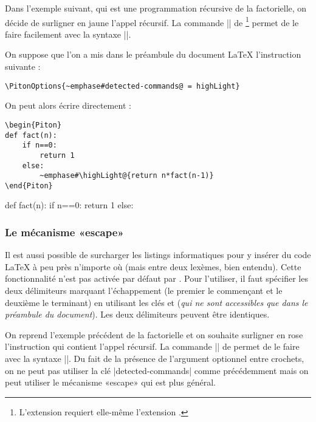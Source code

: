 \documentclass[dvipsnames,svgnames]{article}
\begin{document}
\medskip
Dans l'exemple suivant, qui est une programmation récursive de la factorielle, on décide
de surligner en jaune l'appel récursif. La commande |\highLight| de
\footnote{L'extension  requiert elle-même l'extension
  .} permet de le faire facilement avec la
syntaxe ||.

\smallskip
On suppose que l'on a mis dans le préambule du document LaTeX l'instruction suivante :
\begin{Verbatim}
\PitonOptions{~emphase#detected-commands@ = highLight}
\end{Verbatim}

On peut alors écrire directement :
\begin{Verbatim}
\begin{Piton}
def fact(n):
    if n==0:
        return 1
    else:
        ~emphase#\highLight@{return n*fact(n-1)}
\end{Piton}
\end{Verbatim}

\begin{Piton}
def fact(n):
    if n==0:
        return 1
    else:
\end{Piton}


\subsubsection{Le mécanisme «escape»}

\label{escape}

Il est aussi possible de surcharger les listings informatiques pour y insérer du code
LaTeX à peu près n'importe où (mais entre deux lexèmes, bien entendu). Cette
fonctionnalité n'est pas activée par défaut par . Pour l'utiliser, il faut
spécifier les deux délimiteurs marquant l'échappement (le premier le commençant et le
deuxième le terminant) en utilisant les clés  et
 (\emph{qui ne sont accessibles que dans le préambule du
  document}). Les deux délimiteurs peuvent être identiques.

\medskip
On reprend l'exemple précédent de la factorielle et on souhaite surligner en rose
l'instruction qui contient l'appel récursif. La commande |\highLight| de 
permet de le faire avec la syntaxe ||. Du fait de la présence de
l'argument optionnel entre crochets, on ne peut pas utiliser la clé |detected-commands|
comme précédemment mais on peut utiliser le mécanisme «escape» qui est plus général.
\end{document}
